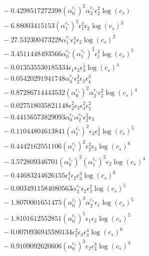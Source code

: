 \documentclass[10pt]{article}
\begin{document}
\begin{align*}
&{}  - 0.4298517272398 \left(\alpha_{0}^{c_s}\right)^{2} \alpha_{2}^{c_s} \epsilon_{2}^{2} \log{\left(c_{s} \right)} \\
&{}  - 6.88003415153 \left(\alpha_{1}^{c_s}\right)^{2} \epsilon_{1}^{2} \epsilon_{2} \log{\left(c_{s} \right)}^{3} \\
&{}  - 27.532300473228 \alpha_{1}^{c_s} \epsilon_{1}^{4} \epsilon_{2} \log{\left(c_{s} \right)}^{2} \\
&{}  - 3.4511448493566 \alpha_{0}^{c_s} \left(\alpha_{1}^{c_s}\right)^{2} \epsilon_{1}^{2} \log{\left(c_{s} \right)}^{5} \\
&{}  - 0.013535530185334 \epsilon_{1} \epsilon_{2} \epsilon_{3}^{5} \log{\left(c_{s} \right)}^{4} \\
&{}  - 0.05420291941748 \alpha_{0}^{c_s} \epsilon_{2}^{2} \epsilon_{3} \epsilon_{4}^{3} \\
&{}  - 0.87286714443532 \left(\alpha_{0}^{c_s}\right)^{2} \alpha_{2}^{c_s} \epsilon_{2}^{2} \log{\left(c_{s} \right)}^{4} \\
&{}  - 0.027518035821148 \epsilon_{2}^{2} \epsilon_{3} \epsilon_{4}^{2} \epsilon_{5}^{2} \\
&{}  - 0.44156573829093 \alpha_{0}^{c_s} \alpha_{2}^{c_s} \epsilon_{2}^{2} \epsilon_{3} \\
&{}  - 0.11044804613841 \left(\alpha_{1}^{c_s}\right)^{2} \epsilon_{2} \epsilon_{3}^{2} \log{\left(c_{s} \right)}^{5} \\
&{}  - 0.4442162551106 \left(\alpha_{1}^{c_s}\right)^{2} \epsilon_{2}^{2} \epsilon_{3} \log{\left(c_{s} \right)}^{6} \\
&{}  - 3.572809346701 \left(\alpha_{0}^{c_s}\right)^{2} \left(\alpha_{1}^{c_s}\right)^{2} \epsilon_{2} \log{\left(c_{s} \right)}^{4} \\
&{}  - 0.44683244626155 \epsilon_{1}^{3} \epsilon_{2} \epsilon_{3}^{3} \log{\left(c_{s} \right)}^{6} \\
&{}  - 0.0034911584080563 \alpha_{3}^{c_s} \epsilon_{2} \epsilon_{3}^{2} \log{\left(c_{s} \right)}^{5} \\
&{}  - 1.8070001651475 \left(\alpha_{0}^{c_s}\right)^{3} \alpha_{2}^{c_s} \epsilon_{1} \log{\left(c_{s} \right)}^{5} \\
&{}  - 1.8101612552851 \left(\alpha_{0}^{c_s}\right)^{5} \epsilon_{1} \epsilon_{2} \log{\left(c_{s} \right)}^{5} \\
&{}  - 0.0070936945580134 \epsilon_{2}^{2} \epsilon_{3} \epsilon_{4}^{4} \log{\left(c_{s} \right)}^{6} \\
&{}  - 0.9109092620606 \left(\alpha_{0}^{c_s}\right)^{3} \epsilon_{2} \epsilon_{3}^{3} \log{\left(c_{s} \right)}^{3} \\

\end{align*}
\end{document}
